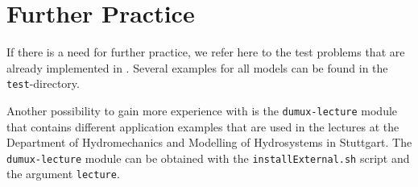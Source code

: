 \section{Further Practice}
\label{tutorial-furtherpractice}

If there is a need for further practice, we refer here to the test problems that
are already implemented in \Dumux. Several examples for all models
can be found in the \texttt{test}-directory. %

Another possibility to gain more experience with \Dumux is the \texttt{dumux-lecture} module
that contains different application examples that are used in the lectures at the
Department of Hydromechanics and Modelling of Hydrosystems in Stuttgart.
The \texttt{dumux-lecture} module can be obtained with the \texttt{installExternal.sh} 
script and the argument \texttt{lecture}. 

